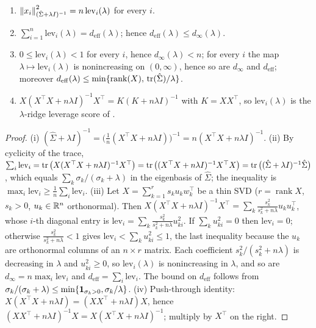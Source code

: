 \begin{lemma}\label{lem:B1-leverage}
\begin{enumerate}[label=(\roman*)]
\item $\left\|x_i\right\|^2_{(\hat\Sigma+\lambda I)^{-1}}=n\,\mathrm{lev}_i(\lambda)$ for every $i$.
\item $\sum_{i=1}^n\mathrm{lev}_i(\lambda)=d_{\mathrm{eff}}(\lambda)$; hence
$d_{\mathrm{eff}}(\lambda)\le d_\infty(\lambda)$.
\item $0\le\mathrm{lev}_i(\lambda)<1$ for every $i$, hence $d_\infty(\lambda)<n$; for every $i$ the map
$\lambda\mapsto\mathrm{lev}_i(\lambda)$ is nonincreasing on $(0,\infty)$, hence so are $d_\infty$ and
$d_{\mathrm{eff}}$; moreover
$d_{\mathrm{eff}}(\lambda)\le\min\{\operatorname{rank}(X),\,\operatorname{tr}(\hat\Sigma)/\lambda\}$.
\item $X(X^\top X+n\lambda I)^{-1}X^\top=K(K+n\lambda I)^{-1}$ with $K=XX^\top$, so $\mathrm{lev}_i(\lambda)$ is
the $\lambda$-ridge leverage score of \cite[Def.~1]{elalaoui2015fast}.
\end{enumerate}
\end{lemma}
\begin{proof}
(i) $(\hat\Sigma+\lambda I)^{-1}=\big(\frac1n(X^\top X+n\lambda I)\big)^{-1}=n(X^\top X+n\lambda I)^{-1}$.
(ii) By cyclicity of the trace,
$\sum_i\mathrm{lev}_i=\operatorname{tr}\big(X(X^\top X+n\lambda I)^{-1}X^\top\big)=\operatorname{tr}\big((X^\top X+n\lambda I)^{-1}X^\top X\big)
=\operatorname{tr}\big((\hat\Sigma+\lambda I)^{-1}\hat\Sigma\big)$, which equals $\sum_k\sigma_k/(\sigma_k+\lambda)$ in
the eigenbasis of $\hat\Sigma$; the inequality is $\max_i\mathrm{lev}_i\ge\frac1n\sum_i\mathrm{lev}_i$.
(iii) Let $X=\sum_{k=1}^{r}s_ku_kw_k^\top$ be a thin SVD ($r=\operatorname{rank}X$, $s_k>0$,
$u_k\in\mathbb{R}^n$ orthonormal). Then $X(X^\top X+n\lambda I)^{-1}X^\top=\sum_k\frac{s_k^2}{s_k^2+n\lambda}u_ku_k^\top$,
whose $i$-th diagonal entry is $\mathrm{lev}_i=\sum_k\frac{s_k^2}{s_k^2+n\lambda}u_{ki}^2$. If
$\sum_ku_{ki}^2=0$ then $\mathrm{lev}_i=0$; otherwise $\frac{s_k^2}{s_k^2+n\lambda}<1$ gives
$\mathrm{lev}_i<\sum_ku_{ki}^2\le1$, the last inequality because the $u_k$ are orthonormal columns of an
$n\times r$ matrix. Each coefficient $s_k^2/(s_k^2+n\lambda)$ is decreasing in $\lambda$ and $u_{ki}^2\ge0$,
so $\mathrm{lev}_i(\lambda)$ is nonincreasing in $\lambda$, and so are $d_\infty=n\max_i\mathrm{lev}_i$ and
$d_{\mathrm{eff}}=\sum_i\mathrm{lev}_i$. The bound on $d_{\mathrm{eff}}$ follows from
$\sigma_k/(\sigma_k+\lambda)\le\min\{\mathbf{1}_{\sigma_k>0},\sigma_k/\lambda\}$.
(iv) Push-through identity: $X(X^\top X+n\lambda I)=(XX^\top+n\lambda I)X$, hence
$(XX^\top+n\lambda I)^{-1}X=X(X^\top X+n\lambda I)^{-1}$; multiply by $X^\top$ on the right.
\end{proof}

